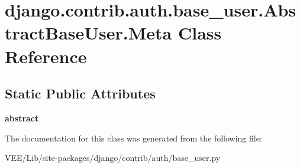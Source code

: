 \hypertarget{classdjango_1_1contrib_1_1auth_1_1base__user_1_1_abstract_base_user_1_1_meta}{}\section{django.\+contrib.\+auth.\+base\+\_\+user.\+Abstract\+Base\+User.\+Meta Class Reference}
\label{classdjango_1_1contrib_1_1auth_1_1base__user_1_1_abstract_base_user_1_1_meta}
\subsection*{Static Public Attributes}
\begin{DoxyCompactItemize}
\item 
\mbox{\label{classdjango_1_1contrib_1_1auth_1_1base__user_1_1_abstract_base_user_1_1_meta_ac6126071981a835c9ee7bd0a88b770d0}} 
{\bfseries abstract}
\end{DoxyCompactItemize}


The documentation for this class was generated from the following file\+:\begin{DoxyCompactItemize}
\item 
V\+E\+E/\+Lib/site-\/packages/django/contrib/auth/base\+\_\+user.\+py\end{DoxyCompactItemize}

